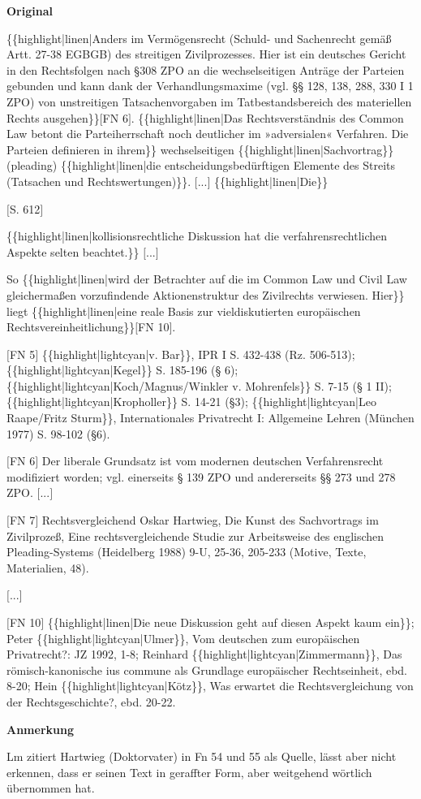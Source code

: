 \documentclass[ngerman,final,fontsize=12pt,paper=a4,twoside,bibliography=totocnumbered,BCOR=8mm,draft=false]{scrartcl}
\newenvironment{fragment}
	{\begin{snugshade}}
	{\end{snugshade}
	 \penalty-200
	 \vskip 0pt plus 10mm minus 5mm}
\newenvironment{fragmentpart}[1]
	{\noindent\textbf{#1}\par\penalty500}
	{\par}
\begin{document}
\begin{fragment}
\begin{fragmentpart}{Original \cite[S.~611,~612 Z.~5--20,~104--123,~1--2,~8--10,~114--117]{Hartwieg-1993}}
{\{\{highlight|linen|Anders im Vermögensrecht (Schuld- und Sachenrecht gemäß Artt. 27-38 EGBGB) des streitigen Zivilprozesses. Hier ist ein deutsches Gericht in den Rechtsfolgen nach §308 ZPO an die wechselseitigen Anträge der Parteien gebunden und kann dank der Verhandlungsmaxime (vgl. §§ 128, 138, 288, 330 I 1 ZPO) von unstreitigen Tatsachenvorgaben im Tatbestandsbereich des materiellen Rechts ausgehen\}\}$[$FN 6$]$. \{\{highlight|linen|Das Rechtsverständnis des Common Law betont die Parteiherrschaft noch deutlicher im »adversialen« Verfahren. Die Parteien definieren in ihrem\}\} wechselseitigen \{\{highlight|linen|Sachvortrag\}\} (pleading) \{\{highlight|linen|die entscheidungsbedürftigen Elemente des Streits (Tatsachen und Rechtswertungen)\}\}. $[$...$]$ \{\{highlight|linen|Die\}\}

$[$S. 612$]$

\{\{highlight|linen|kollisionsrechtliche Diskussion hat die verfahrensrechtlichen Aspekte selten beachtet.\}\} $[$...$]$

So \{\{highlight|linen|wird der Betrachter auf die im Common Law und Civil Law gleichermaßen vorzufindende Aktionenstruktur des Zivilrechts verwiesen. Hier\}\} liegt \{\{highlight|linen|eine reale Basis zur vieldiskutierten europäischen Rechtsvereinheitlichung\}\}$[$FN 10$]$.
 
$[$FN 5$]$ \{\{highlight|lightcyan|v. Bar\}\}, IPR I S. 432-438 (Rz. 506-513); \{\{highlight|lightcyan|Kegel\}\} S. 185-196 (§ 6); \{\{highlight|lightcyan|Koch/Magnus/Winkler v. Mohrenfels\}\} S. 7-15 (§ 1 II); \{\{highlight|lightcyan|Kropholler\}\} S. 14-21 (§3); \{\{highlight|lightcyan|Leo Raape/Fritz Sturm\}\}, Internationales Privatrecht I: Allgemeine Lehren (München 1977) S. 98-102 (§6). 

$[$FN 6$]$ Der liberale Grundsatz ist vom modernen deutschen Verfahrensrecht modifiziert worden; vgl. einerseits § 139 ZPO und andererseits §§ 273 und 278 ZPO. $[$...$]$

$[$FN 7$]$ Rechtsvergleichend Oskar Hartwieg, Die Kunst des Sachvortrags im Zivilprozeß, Eine rechtsvergleichende Studie zur Arbeitsweise des englischen Pleading-Systems (Heidelberg 1988) 9-U, 25-36, 205-233 (Motive, Texte, Materialien, 48).

$[$...$]$

$[$FN 10$]$ \{\{highlight|linen|Die neue Diskussion geht auf diesen Aspekt kaum ein\}\}; Peter \{\{highlight|lightcyan|Ulmer\}\}, Vom deutschen zum europäischen Privatrecht?: JZ 1992, 1-8; Reinhard \{\{highlight|lightcyan|Zimmermann\}\}, Das römisch-kanonische ius commune als Grundlage europäischer Rechtseinheit, ebd. 8-20; Hein \{\{highlight|lightcyan|Kötz\}\}, Was erwartet die Rechtsvergleichung von der Rechtsgeschichte?, ebd. 20-22.}
\end{fragmentpart}
\begin{fragmentpart}{Anmerkung}
Lm zitiert Hartwieg (Doktorvater) in Fn 54 und 55 als Quelle, lässt aber nicht erkennen, dass er seinen Text in geraffter Form, aber weitgehend wörtlich übernommen hat.


\end{fragmentpart}
\end{fragment}
\end{document}

